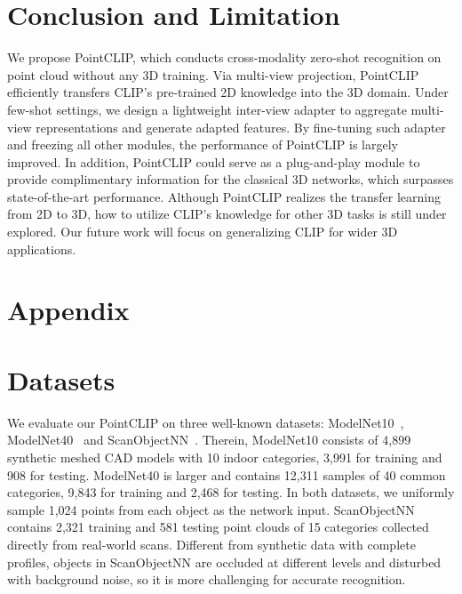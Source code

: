 \documentclass[10pt,twocolumn,letterpaper]{article}
\begin{document}
\section{Conclusion and Limitation}
\label{sec:conclusion}

We propose PointCLIP, which conducts cross-modality zero-shot recognition on point cloud without any 3D training. Via multi-view projection, PointCLIP efficiently transfers CLIP's pre-trained 2D knowledge into the 3D domain. Under few-shot settings, we design a lightweight inter-view adapter to aggregate multi-view representations and generate adapted features. By fine-tuning such adapter and freezing all other modules, the performance of PointCLIP is largely improved. In addition, PointCLIP could serve as a plug-and-play module to provide complimentary information for the classical 3D networks, which surpasses state-of-the-art performance. Although PointCLIP realizes the transfer learning from 2D to 3D, how to utilize CLIP's knowledge for other 3D tasks is still under explored. Our future work will focus on generalizing CLIP for wider 3D applications.

{\small


}

\clearpage
\appendix

\section*{Appendix}
\maketitle


\section{Datasets}
We evaluate our PointCLIP on three well-known datasets: ModelNet10~\cite{wu20153d}, ModelNet40~\cite{wu20153d} and ScanObjectNN~\cite{uy2019revisiting}. Therein, ModelNet10 consists of 4,899 synthetic meshed CAD models with 10 indoor categories, 3,991 for training and 908 for testing. ModelNet40 is larger and contains 12,311 samples of 40 common categories, 9,843 for training and 2,468 for testing. In both datasets, we uniformly sample 1,024 points from each object as the network input. ScanObjectNN contains 2,321 training and 581 testing point clouds of 15 categories collected directly from real-world scans. Different from synthetic data with complete profiles, objects in ScanObjectNN are occluded at different levels and disturbed with background noise, so it is more challenging for accurate recognition.
\end{document}

